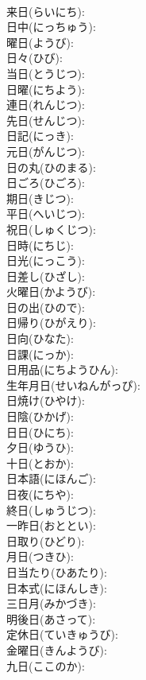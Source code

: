 \documentclass[8pt]{extreport}
\begin{document}
\begin{CJK}{UTF8}{min}
\\	来日(らいにち): 
\\	日中(にっちゅう): 
\\	曜日(ようび): 
\\	日々(ひび): 
\\	当日(とうじつ): 
\\	日曜(にちよう): 
\\	連日(れんじつ): 
\\	先日(せんじつ): 
\\	日記(にっき): 
\\	元日(がんじつ): 
\\	日の丸(ひのまる): 
\\	日ごろ(ひごろ): 
\\	期日(きじつ): 
\\	平日(へいじつ): 
\\	祝日(しゅくじつ): 
\\	日時(にちじ): 
\\	日光(にっこう): 
\\	日差し(ひざし): 
\\	火曜日(かようび): 
\\	日の出(ひので): 
\\	日帰り(ひがえり): 
\\	日向(ひなた): 
\\	日課(にっか): 
\\	日用品(にちようひん): 
\\	生年月日(せいねんがっぴ): 
\\	日焼け(ひやけ): 
\\	日陰(ひかげ): 
\\	日日(ひにち): 
\\	夕日(ゆうひ): 
\\	十日(とおか): 
\\	日本語(にほんご): 
\\	日夜(にちや): 
\\	終日(しゅうじつ): 
\\	一昨日(おととい): 
\\	日取り(ひどり): 
\\	月日(つきひ): 
\\	日当たり(ひあたり): 
\\	日本式(にほんしき): 
\\	三日月(みかづき): 
\\	明後日(あさって): 
\\	定休日(ていきゅうび): 
\\	金曜日(きんようび): 
\\	九日(ここのか): 

\end{CJK}
\end{document}
